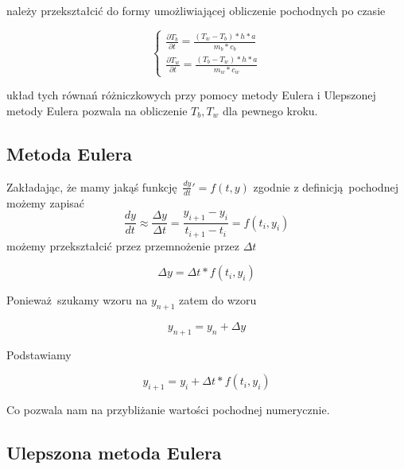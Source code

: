 \documentclass[varwidth,12pt,a4paper]{article}
\begin{document}
należy przekształcić do formy umożliwiającej obliczenie pochodnych po czasie

\begin{equation}
     \begin{cases}
    \frac{\partial T_b}{\partial t}=\frac{(T_w-T_b)*h*a}{m_b*c_b} \\
    \frac{\partial T_w}{\partial t}=\frac{(T_b-T_w)*h*a}{m_w*c_w} 
    \end{cases}
\end{equation}

układ tych równań różniczkowych przy pomocy metody Eulera i Ulepszonej metody Eulera pozwala na obliczenie $T_b, T_w$ dla pewnego kroku.



\subsection{Metoda Eulera}

Zakładając, że mamy jakąś funkcję $\frac{dy}{dt}' = f(t,y)$
zgodnie z definicją pochodnej możemy zapisać
\begin{equation}
   \frac{dy}{dt} \approx \frac{\Delta y}{\Delta t} = \frac{y_{i+1} - y_i}{t_{i+1} - t_i} = f(t_i, y_i)
\end{equation}
możemy przekształcić przez przemnożenie przez $\Delta t$

\begin{equation}
    \Delta y = \Delta t * f(t_i, y_i)
\end{equation}

Ponieważ szukamy wzoru na $y_{n+1}$ zatem do wzoru

\begin{equation}
    y_{n+1} = y_n + \Delta y
\end{equation}

Podstawiamy

\begin{equation}
    y_{i+1} = y_i + \Delta t * f(t_i, y_i)
\end{equation}

Co pozwala nam na przybliżanie wartości pochodnej numerycznie.



\subsection{Ulepszona metoda Eulera}
\end{document}
